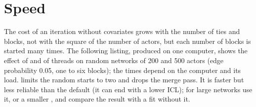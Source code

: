 \section{Speed}
The cost of an iteration without covariates grows with the number of ties and blocks, not with the square of the number of actors, but each number of blocks is started many times. The following listing, produced on one computer, shows the effect of  and of threads on random networks of 200 and 500 actors (edge probability 0.05, one to six blocks); the times depend on the computer and its load.
 limits the random starts to two and drops the merge pass. It is faster but less reliable than the default (it can end with a lower ICL); for large networks use it, or a smaller , and compare the result with a fit without it.
